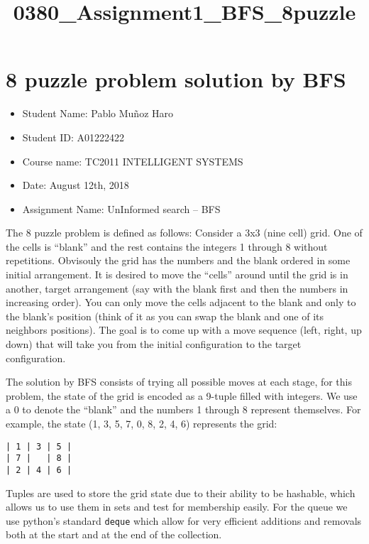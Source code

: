 \documentclass[11pt]{article}
\title{0380\_Assignment1\_BFS\_8puzzle}
\providecommand{\tightlist}{%
      \setlength{\itemsep}{0pt}\setlength{\parskip}{0pt}}
\begin{document}
    
    
    \maketitle
    
    

    
    \hypertarget{puzzle-problem-solution-by-bfs}{%
\section{8 puzzle problem solution by
BFS}\label{puzzle-problem-solution-by-bfs}}

\begin{itemize}
\tightlist
\item
  Student Name: Pablo Muñoz Haro
\item
  Student ID: A01222422
\item
  Course name: TC2011 INTELLIGENT SYSTEMS
\item
  Date: August 12th, 2018
\item
  Assignment Name: UnInformed search -- BFS
\end{itemize}

The 8 puzzle problem is defined as follows: Consider a 3x3 (nine cell)
grid. One of the cells is ``blank'' and the rest contains the integers 1
through 8 without repetitions. Obvisouly the grid has the numbers and
the blank ordered in some initial arrangement. It is desired to move the
``cells'' around until the grid is in another, target arrangement (say
with the blank first and then the numbers in increasing order). You can
only move the cells adjacent to the blank and only to the blank's
position (think of it as you can swap the blank and one of its neighbors
positions). The goal is to come up with a move sequence (left, right, up
down) that will take you from the initial configuration to the target
configuration.

The solution by BFS consists of trying all possible moves at each stage,
for this problem, the state of the grid is encoded as a 9-tuple filled
with integers. We use a 0 to denote the ``blank'' and the numbers 1
through 8 represent themselves. For example, the state (1, 3, 5, 7, 0,
8, 2, 4, 6) represents the grid:

\begin{verbatim}
| 1 | 3 | 5 |
| 7 |   | 8 |
| 2 | 4 | 6 |
\end{verbatim}

Tuples are used to store the grid state due to their ability to be
hashable, which allows us to use them in sets and test for membership
easily. For the queue we use python's standard \texttt{deque} which
allow for very efficient additions and removals both at the start and at
the end of the collection.
\end{document}
